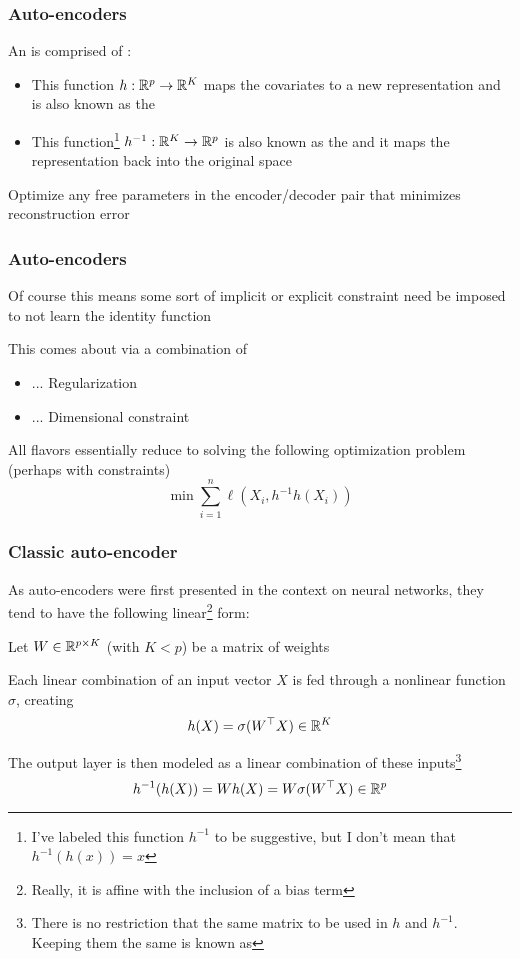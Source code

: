 \documentclass[12pt]{beamer}
\begin{document}
\begin{frame}[fragile]
\frametitle{Auto-encoders}
An  is comprised of 
:
\vsp

\begin{itemize}
\item {} This function $h: \mathbb{R}^p \rightarrow \mathbb{R}^K$ 
maps the covariates to a new representation
and is also known as the  
\item {} This 
function\footnote{I've labeled this function
$h^{-1}$ to be suggestive, but I don't mean that $h^{-1}(h(x)) = x$} 
$h^{-1}: \mathbb{R}^K \rightarrow \mathbb{R}^p$ 
is also known as the  and it maps the
representation back into the original space
\end{itemize}
\vsp

 Optimize any free parameters in the encoder/decoder pair that minimizes reconstruction
error

\end{frame}

\begin{frame}[fragile]
\frametitle{Auto-encoders}
Of course this means some sort of implicit or explicit constraint need be imposed to not learn the identity 
function

\vsp
This comes about via a combination of
\begin{itemize}
\item ... Regularization

\item ... Dimensional constraint

\end{itemize}
All flavors essentially reduce to solving the following optimization problem (perhaps with constraints)
\[
\min \sum_{i=1}^n \ell(X_i, h^{-1} h(X_i))
\]
\end{frame}


\begin{frame}[fragile]
\frametitle{Classic auto-encoder}
As auto-encoders were first presented in the context on neural networks, they tend to have
the following linear\footnote{Really, it is affine with the inclusion of a bias term} form:

\vsp
Let $W \in \mathbb{R}^{p \times K}$ (with $K < p$) be a matrix of weights

\vsp
Each linear combination of an input vector $X$ is fed through a nonlinear function $\sigma$, creating
\[
h(X) = \sigma(W^{\top}X)\in \mathbb{R}^K
\]

\vsp
The output layer is then modeled as a linear combination of these inputs\footnote{There is no restriction that
the same matrix to be used in $h$ and $h^{-1}$.  Keeping them the same is known as }
\[
h^{-1}(h(X)) = Wh(X) = W\sigma(W^{\top}X) \in \mathbb{R}^p
\]
\end{frame}
\end{document}
